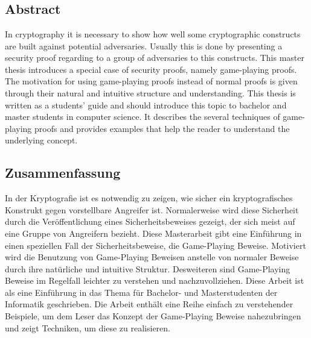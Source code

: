 \chapter*{}
\section*{Abstract}

In cryptography it is necessary to show how well some cryptographic constructs are built against potential adversaries.
Usually this is done by presenting a security proof regarding to a group of adversaries to this constructs. This master thesis
introduces a special case of security proofs, namely game-playing proofs. The motivation for using game-playing proofs instead
of normal proofs is given through their natural and intuitive structure and understanding. This thesis is written as a
students' guide and should introduce this topic to bachelor and master students in computer science. It describes the
several techniques of game-playing proofs and provides examples that help the reader to understand the underlying concept.
\vfill

\section*{Zusammenfassung}

In der Kryptografie ist es notwendig zu zeigen, wie sicher ein kryptografisches Konstrukt gegen vorstellbare Angreifer ist.
Normalerweise wird diese Sicherheit durch die Veröffentlichung eines Sicherheitsbeweises gezeigt, der sich meist auf eine Gruppe
von Angreifern bezieht. Diese Masterarbeit gibt eine Einführung in einen speziellen Fall der
Sicherheitsbeweise, die Game-Playing Beweise. Motiviert wird die Benutzung von Game-Playing Beweisen anstelle von normaler
Beweise durch ihre natürliche und intuitive Struktur. Desweiteren sind Game-Playing Beweise im Regelfall leichter zu verstehen
und nachzuvollziehen. Diese Arbeit ist als eine Einführung in das Thema für Bachelor- und Masterstudenten der Informatik geschrieben.
Die Arbeit enthält eine Reihe einfach zu verstehender Beispiele, um dem Leser das Konzept der Game-Playing Beweise nahezubringen
und zeigt Techniken, um diese zu realisieren.



